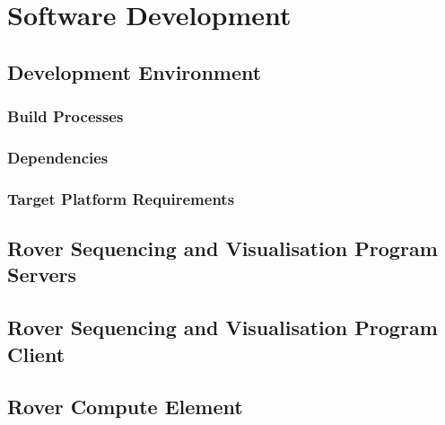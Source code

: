 \section{Software Development}
\label{sec:softwareDevelopment}
  \subsection{Development Environment}
    \subsubsection{Build Processes}
    \subsubsection{Dependencies}
    \subsubsection{Target Platform Requirements} 
    
  \subsection{Rover Sequencing and Visualisation Program Servers}
  \subsection{Rover Sequencing and Visualisation Program Client}
  \subsection{Rover Compute Element}
    